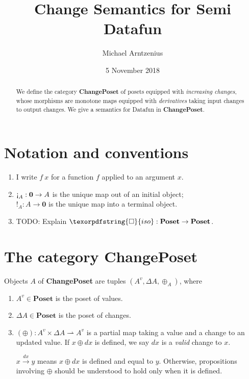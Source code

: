 \documentclass{rntz}
\title{Change Semantics for Semi\naive{} Datafun}
\author{Michael Arntzenius}
\date{5 November 2018}
\newcommand\todo[1]{{\color{Rhodamine}#1}}
\newcommand\cat\textbf
\newcommand\strong\textbf
\newcommand\CP{\cat{ChangePoset}}
\newcommand\Poset{\cat{Poset}}
\newcommand\initO{\ensuremath{\mathbold{0}}}
\newcommand\initE{\mathop{\text{\textexclamdown}}}
\newcommand\termI{\mathop{!}}
\newcommand\D\Delta
\newcommand\x\times
\newcommand\iso{\texorpdfstring{\ensuremath{\square}}{iso}}
\newcommand\vals[1]{#1^v} %
\newcommand\chgs[1]{\D{#1}}
\newcommand\validarrow\to
\newcommand\vld[3]{{#2 \mathrel{\overset{#1}{\validarrow}} #3}}
\begin{document}
\maketitle

\begin{abstract}
  We define the category \CP{} of posets equipped with \emph{increasing
    changes}, whose morphisms are monotone maps equipped with \emph{derivatives}
  taking input changes to output changes. We give a semantics for Datafun in
  \CP.
\end{abstract}


\section{Notation and conventions}

\begin{enumerate}
\item I write $f~x$ for a function $f$ applied to an argument $x$.
\item $\initE_A : \initO \to A$ is the unique map out of an initial object;\\
  $\termI_A : A \to \initO$ is the unique map into a terminal object.
\item \todo{TODO: Explain $\iso : \Poset \to \Poset$.}
\end{enumerate}


\section{The category \CP}

\newcommand\pto\rightharpoonup
\newcommand\upd\oplus

Objects $A$ of \CP{} are tuples $(\vals A, \chgs A, \upd_A)$, where
\begin{enumerate}
\item $\vals A \in \Poset$ is the poset of values.

\item $\chgs A \in \Poset$ is the poset of changes.
\item $(\upd) : \vals A \x \chgs A \pto \vals A$ is a partial map
  taking a value and a change to an updated value. If $x \upd dx$ is defined, we
  say $dx$ is a \emph{valid} change to $x$.

  $\vld{dx} x y$ means $x \upd dx$ is defined and equal to $y$. Otherwise,
  propositions involving $\upd$ should be understood to hold only when it is
  defined.
\end{enumerate}
\end{document}
